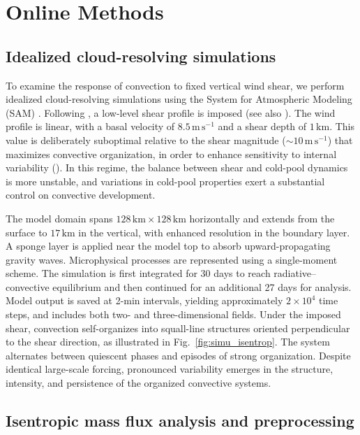 \documentclass[11pt]{article}
\begin{document}
\section{Online Methods}\label{sec:methods}

\subsection{Idealized cloud-resolving simulations}

To examine the response of convection to fixed vertical wind shear, we perform idealized cloud-resolving simulations using the System for Atmospheric Modeling (SAM) \cite{khairoutdinov2003}. Following \cite{muller2013impact}, a low-level shear profile is imposed (see also \cite{rotunno1988theory, houze1977structure, robe2001effect}). The wind profile is linear, with a basal velocity of $8.5\,\mathrm{m\,s^{-1}}$ and a shear depth of $1\,\mathrm{km}$. This value is deliberately suboptimal relative to the shear magnitude ($\sim10\,\mathrm{m\,s^{-1}}$) that maximizes convective organization, in order to enhance sensitivity to internal variability (\cite{abramian2022shear}). In this regime, the balance between shear and cold-pool dynamics is more unstable, and variations in cold-pool properties exert a substantial control on convective development.

The model domain spans $128\,\mathrm{km} \times 128\,\mathrm{km}$ horizontally and extends from the surface to $17\,\mathrm{km}$ in the vertical, with enhanced resolution in the boundary layer. A sponge layer is applied near the model top to absorb upward-propagating gravity waves. Microphysical processes are represented using a single-moment scheme. The simulation is first integrated for 30 days to reach radiative--convective equilibrium and then continued for an additional 27 days for analysis. Model output is saved at 2-min intervals, yielding approximately $2\times10^{4}$ time steps, and includes both two- and three-dimensional fields. Under the imposed shear, convection self-organizes into squall-line structures oriented perpendicular to the shear direction, as illustrated in Fig.~\ref{fig:simu_isentrop}. The system alternates between quiescent phases and episodes of strong organization. Despite identical large-scale forcing, pronounced variability emerges in the structure, intensity, and persistence of the organized convective systems.

\subsection{Isentropic mass flux analysis and preprocessing}
\end{document}
